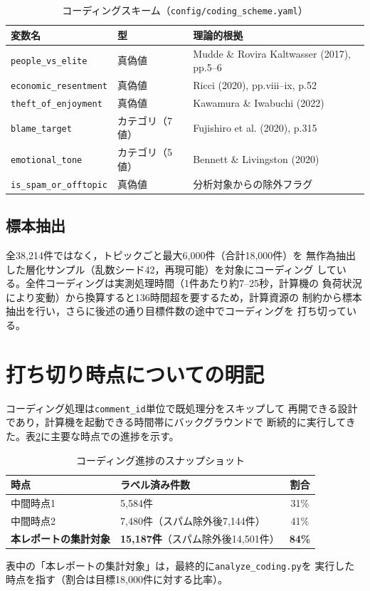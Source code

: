 \documentclass[dvipdfmx, a4paper, 11pt]{jsarticle}
\begin{document}
\begin{table}[H]
\centering
\caption{コーディングスキーム（\texttt{config/coding\_scheme.yaml}）}
\label{tab:variables}
\begin{tabular}{lll}
\toprule
変数名 & 型 & 理論的根拠 \\
\midrule
\texttt{people\_vs\_elite} & 真偽値 & Mudde \& Rovira Kaltwasser (2017), pp.5--6 \\
\texttt{economic\_resentment} & 真偽値 & Ricci (2020), pp.viii--ix, p.52 \\
\texttt{theft\_of\_enjoyment} & 真偽値 & Kawamura \& Iwabuchi (2022) \\
\texttt{blame\_target} & カテゴリ（7値） & Fujishiro et al. (2020), p.315 \\
\texttt{emotional\_tone} & カテゴリ（5値） & Bennett \& Livingston (2020) \\
\texttt{is\_spam\_or\_offtopic} & 真偽値 & 分析対象からの除外フラグ \\
\bottomrule
\end{tabular}
\end{table}

\subsection{標本抽出}
全38{,}214件ではなく，トピックごと最大6{,}000件（合計18{,}000件）を
無作為抽出した層化サンプル（乱数シード42，再現可能）を対象にコーディング
している。全件コーディングは実測処理時間（1件あたり約7--25秒，計算機の
負荷状況により変動）から換算すると136時間超を要するため，計算資源の
制約から標本抽出を行い，さらに後述の通り目標件数の途中でコーディングを
打ち切っている。

\section{打ち切り時点についての明記}
\label{sec:cutoff}
コーディング処理は\texttt{comment\_id}単位で既処理分をスキップして
再開できる設計であり，計算機を起動できる時間帯にバックグラウンドで
断続的に実行してきた。表\ref{tab:progress}に主要な時点での進捗を示す。

\begin{table}[H]
\centering
\small
\caption{コーディング進捗のスナップショット}
\label{tab:progress}
\begin{tabular}{p{4.5cm}p{4.5cm}c}
\toprule
時点 & ラベル済み件数 & 割合 \\
\midrule
中間時点1 & 5{,}584件 & 31\% \\
中間時点2 & 7{,}480件（スパム除外後7{,}144件） & 41\% \\
\textbf{本レポートの集計対象} & \textbf{15{,}187件}（スパム除外後14{,}501件） & \textbf{84\%} \\
\bottomrule
\end{tabular}
\end{table}
表中の「本レポートの集計対象」は，最終的に\texttt{analyze\_coding.py}を
実行した時点を指す（割合は目標18{,}000件に対する比率）。
\end{document}
